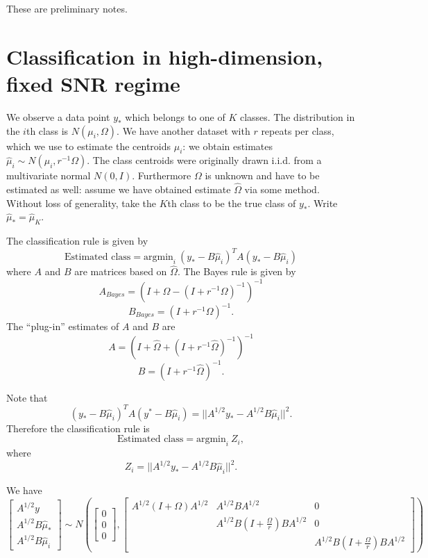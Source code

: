 \documentclass[12pt]{article}
\begin{document}
\maketitle

\newcommand{\tr}{\text{tr}}
\newcommand{\E}{\textbf{E}}
\newcommand{\diag}{\text{diag}}
\newcommand{\argmax}{\text{argmax}}
\newcommand{\Cov}{\text{Cov}}
\newcommand{\Var}{\text{Var}}
\newcommand{\argmin}{\text{argmin}}
\newcommand{\Vol}{\text{Vol}}
\newcommand{\comm}[1]{}

These are preliminary notes.

\section{Classification in high-dimension, fixed SNR regime}

We observe a data point $y_*$ which belongs to one of $K$ classes.
The distribution in the $i$th class is $N(\mu_i, \Omega)$.  We have
another dataset with $r$ repeats per class, which we use to estimate
the centroids $\mu_i$: we obtain estimates $\hat{\mu}_i \sim N(\mu_i,
r^{-1} \Omega)$.  The class centroids were originally drawn
i.i.d. from a multivariate normal $N(0, I)$.  Furthermore $\Omega$ is
unknown and have to be estimated as well: assume we have obtained
estimate $\hat{\Omega}$ via some method.  Without loss of generality,
take the $K$th class to be the true class of $y_*$.  Write
$\hat{\mu}_* = \hat{\mu}_K$.

The classification rule is given by
\[
\text{Estimated class} = \argmin_{i}\ (y_* - B\hat{\mu}_i)^T A (y_* - B\hat{\mu}_i)
\]
where $A$ and $B$ are matrices based on $\hat{\Omega}$.
The Bayes rule is given by
\[
A_{Bayes} = (I + \Omega - (I + r^{-1}\Omega)^{-1})^{-1}
\]
\[
B_{Bayes} = (I + r^{-1} \Omega)^{-1}.
\]
The ``plug-in'' estimates of $A$ and $B$ are
\[
A = (I + \hat{\Omega} + (I + r^{-1}\hat{\Omega})^{-1})^{-1}
\]
\[
B = (I + r^{-1} \hat{\Omega})^{-1}.
\]

Note that
\[
(y_* - B\hat{\mu}_i)^T A (y^* - B\hat{\mu}_i) =
||A^{1/2} y_* - A^{1/2} B\hat{\mu}_i||^2.
\]
Therefore the classification rule is
\[
\text{Estimated class} = \argmin_{i}\ Z_i,
\]
where
\[
Z_i = ||A^{1/2} y_* - A^{1/2} B\hat{\mu}_i||^2.
\]

We have
\[
\begin{bmatrix}
A^{1/2} y \\
A^{1/2} B \hat{\mu}_*\\
A^{1/2} B \hat{\mu}_i
\end{bmatrix}
\sim
N\left(
\begin{bmatrix}
0\\0\\0
\end{bmatrix},
\begin{bmatrix}
A^{1/2}(I + \Omega) A^{1/2} & A^{1/2}B A^{1/2} & 0\\
 & A^{1/2}B(I + \frac{\Omega}{r})BA^{1/2} & 0\\
 & & A^{1/2}B(I + \frac{\Omega}{r})BA^{1/2}
\end{bmatrix}
\right)
\]
\end{document}
